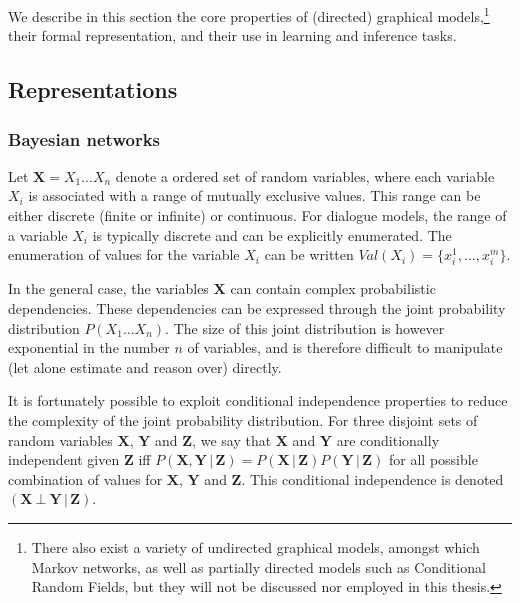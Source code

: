 We describe in this section the core properties of (directed) graphical models,\footnote{There also exist a variety of undirected graphical models, amongst which Markov networks, as well as partially directed models such as Conditional Random Fields, but they will not be discussed nor employed in this thesis.} their formal representation, and their use in learning and inference tasks. 
 
 \subsection{Representations}
 
\subsubsection*{Bayesian networks}

Let $\mathbf{X} = X_1...X_n$ denote a ordered set of random variables, where each variable $X_i$ is associated with a range of mutually exclusive values.  This range can be either discrete (finite or infinite) or continuous.  For dialogue models, the range of a variable $X_i$ is typically discrete and can be explicitly enumerated. The enumeration of values for the variable $X_i$ can be written $Val(X_i) = \{x_i^1, ..., x_i^m\}$.  

In the general case, the variables $\mathbf{X}$ can contain complex probabilistic dependencies.  These dependencies can be expressed through the joint probability distribution $P(X_1...X_n)$.  The size of this joint distribution is however exponential in the number $n$ of variables, and is therefore difficult to manipulate (let alone estimate and reason over) directly. 


It is fortunately possible to exploit conditional independence properties to reduce the complexity of the joint probability distribution.  For three disjoint sets of random variables $\mathbf{X}$, $\mathbf{Y}$ and $\mathbf{Z}$, we say that $\mathbf{X}$ and $\mathbf{Y}$ are conditionally independent given $\mathbf{Z}$ iff $P(\mathbf{X},\mathbf{Y} \, | \, \mathbf{Z}) = P(\mathbf{X} \, | \, \mathbf{Z}) P(\mathbf{Y} \, | \, \mathbf{Z})$ for all possible combination of values for  $\mathbf{X}$, $\mathbf{Y}$ and  $\mathbf{Z}$. This conditional independence is denoted $(\mathbf{X} \ \bot \  \mathbf{Y} \, | \,  \mathbf{Z})$. 

